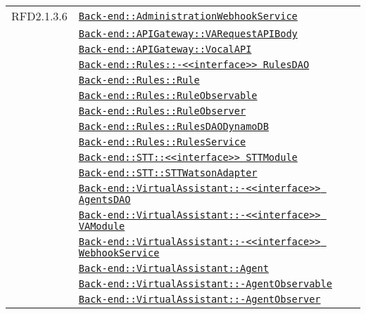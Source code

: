 \begin{longtable}{|>{\centering}m{3cm}|m{10cm}<{\centering}|}
RFD2.1.3.6 & \hyperref[Back-end::AdministrationWebhookService]{\texttt{Back-end::AdministrationWebhookService}}\\
& \hyperref[Back-end::APIGateway::VARequestAPIBody]{\texttt{Back-end::APIGateway::VARequestAPIBody}}\\
& \hyperref[Back-end::APIGateway::VocalAPI]{\texttt{Back-end::APIGateway::VocalAPI}}\\
& \hyperref[Back-end::Rules::<<interface>> RulesDAO]{\texttt{Back-end::Rules::-\linebreak <<interface>> RulesDAO}}\\
& \hyperref[Back-end::Rules::Rule]{\texttt{Back-end::Rules::Rule}}\\
& \hyperref[Back-end::Rules::RuleObservable]{\texttt{Back-end::Rules::RuleObservable}}\\
& \hyperref[Back-end::Rules::RuleObserver]{\texttt{Back-end::Rules::RuleObserver}}\\
& \hyperref[Back-end::Rules::RulesDAODynamoDB]{\texttt{Back-end::Rules::RulesDAODynamoDB}}\\
& \hyperref[Back-end::Rules::RulesService]{\texttt{Back-end::Rules::RulesService}}\\
& \hyperref[Back-end::STT::<<interface>> STTModule]{\texttt{Back-end::STT::<<interface>> STTModule}}\\
& \hyperref[Back-end::STT::STTWatsonAdapter]{\texttt{Back-end::STT::STTWatsonAdapter}}\\
& \hyperref[Back-end::VirtualAssistant::<<interface>> AgentsDAO]{\texttt{Back-end::VirtualAssistant::-\linebreak <<interface>> AgentsDAO}}\\
& \hyperref[Back-end::VirtualAssistant::<<interface>> VAModule]{\texttt{Back-end::VirtualAssistant::-\linebreak <<interface>> VAModule}}\\
& \hyperref[Back-end::VirtualAssistant::<<interface>> WebhookService]{\texttt{Back-end::VirtualAssistant::-\linebreak <<interface>> WebhookService}}\\
& \hyperref[Back-end::VirtualAssistant::Agent]{\texttt{Back-end::VirtualAssistant::Agent}}\\
& \hyperref[Back-end::VirtualAssistant::AgentObservable]{\texttt{Back-end::VirtualAssistant::-\linebreak AgentObservable}}\\
& \hyperref[Back-end::VirtualAssistant::AgentObserver]{\texttt{Back-end::VirtualAssistant::-\linebreak AgentObserver}}\\

\end{longtable}
